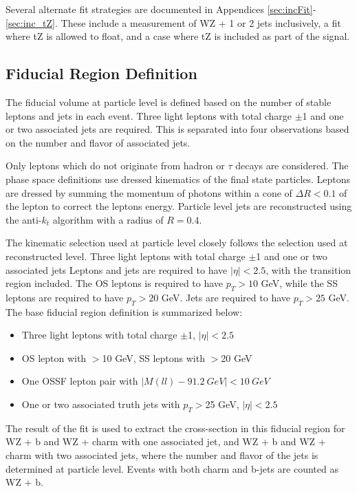 Several alternate fit strategies are documented in Appendices \ref{sec:incFit}-\ref{sec:inc_tZ}. These include a measurement of WZ + 1 or 2 jets inclusively, a fit where tZ is allowed to float, and a case where tZ is included as part of the signal.

\subsection{Fiducial Region Definition}
\label{sec:fid}

The fiducial volume at particle level is defined based on the number of stable leptons and jets in each event. Three light leptons with total charge $\pm$1 and one or two associated jets are required. This is separated into four observations based on the number and flavor of associated jets.

Only leptons which do not originate from hadron or $\tau$ decays are considered. The phase space definitions use dressed kinematics of the final state particles. Leptons are dressed by summing the momentum of photons within a cone of $\Delta R < 0.1$ of the lepton to correct the leptons energy. Particle level jets are reconstructed using the anti-$k_t$ algorithm with a radius of $R=0.4$. 

The kinematic selection used at particle level closely follows the selection used at reconstructed level. Three light leptons with total charge $\pm$1 and one or two associated jets  Leptons and jets are required to have $|\eta| < 2.5$, with the transition region included. The OS leptons is required to have $p_T > 10$ GeV, while the SS leptons are required to have $p_T > 20$ GeV. Jets are required to have $p_T > 25$ GeV. The base fiducial region definition is summarized below:

\begin{itemize}
\item Three light leptons with total charge $\pm$1, $|\eta| < 2.5$
\item OS lepton with \pt$>$10 GeV, SS leptons with \pt$>$20 GeV
\item One OSSF lepton pair with $|M(ll)-91.2\ GeV| < 10\ GeV$
\item One or two associated truth jets with $p_T >$25 GeV, $|\eta| < 2.5$
\end{itemize}

The result of the fit is used to extract the cross-section in this fiducial region for WZ + b and WZ + charm with one associated jet, and WZ + b and WZ + charm with two associated jets, where the number and flavor of the jets is determined at particle level. Events with both charm and b-jets are counted as WZ + b.

